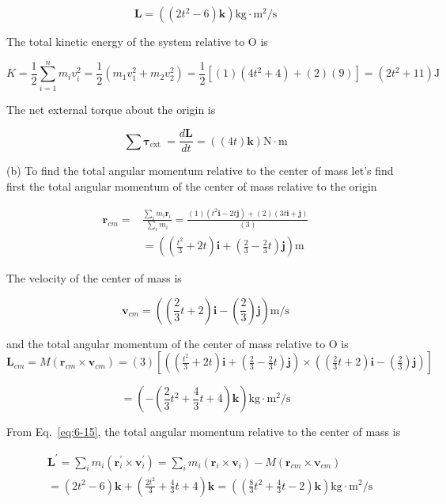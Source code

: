 \documentclass[10pt]{article}
\numberwithin{equation}{section}
\begin{document}
$$
\mathbf{L}=\left(\left(2 t^{2}-6\right) \mathbf{k}\right) \mathrm{kg} \cdot \mathrm{m}^{2} / \mathrm{s}
$$

The total kinetic energy of the system relative to O is

$$
K=\frac{1}{2} \sum_{i=1}^{n} m_{i} v_{i}^{2}=\frac{1}{2}\left(m_{1} v_{1}^{2}+m_{2} v_{2}^{2}\right)=\frac{1}{2}\left[(1)\left(4 t^{2}+4\right)+(2)(9)\right]=\left(2 t^{2}+11\right) \mathrm{J}
$$

The net external torque about the origin is

$$
\sum \boldsymbol{\tau}_{\text {ext }}=\frac{d \mathbf{L}}{d t}=((4 t) \mathbf{k}) \mathrm{N} \cdot \mathrm{m}
$$

(b) To find the total angular momentum relative to the center of mass let's find first the total angular momentum of the center of mass relative to the origin

$$
\begin{aligned}
\mathbf{r}_{c m}= & \frac{\sum_{i} m_{i} \mathbf{r}_{i}}{\sum_{i} m_{i}}=\frac{(1)\left(t^{2} \mathbf{i}-2 t \mathbf{j}\right)+(2)(3 t \mathbf{i}+\mathbf{j})}{(3)} \\
& =\left(\left(\frac{t^{2}}{3}+2 t\right) \mathbf{i}+\left(\frac{2}{3}-\frac{2}{3} t\right) \mathbf{j}\right) \mathrm{m}
\end{aligned}
$$

The velocity of the center of mass is

$$
\mathbf{v}_{c m}=\left(\left(\frac{2}{3} t+2\right) \mathbf{i}-\left(\frac{2}{3}\right) \mathbf{j}\right) \mathrm{m} / \mathrm{s}
$$

and the total angular momentum of the center of mass relative to O is\\
$\mathbf{L}_{c m}=M\left(\mathbf{r}_{c m} \times \mathbf{v}_{c m}\right)=(3)\left[\left(\left(\frac{t^{2}}{3}+2 t\right) \mathbf{i}+\left(\frac{2}{3}-\frac{2}{3} t\right) \mathbf{j}\right) \times\left(\left(\frac{2}{3} t+2\right) \mathbf{i}-\left(\frac{2}{3}\right) \mathbf{j}\right)\right]$

$$
=\left(-\left(\frac{2}{3} t^{2}+\frac{4}{3} t+4\right) \mathbf{k}\right) \mathrm{kg} \cdot \mathrm{m}^{2} / \mathrm{s}
$$

From Eq.~\eqref{eq:6-15}, the total angular momentum relative to the center of mass is

$$
\begin{aligned}
& \mathbf{L}^{\prime}=\sum_{i} m_{i}\left(\mathbf{r}_{i}^{\prime} \times \mathbf{v}_{i}^{\prime}\right)=\sum_{i} m_{i}\left(\mathbf{r}_{i} \times \mathbf{v}_{i}\right)-M\left(\mathbf{r}_{c m} \times \mathbf{v}_{c m}\right) \\
& =\left(2 t^{2}-6\right) \mathbf{k}+\left(\frac{2 t^{2}}{3}+\frac{4}{3} t+4\right) \mathbf{k}=\left(\left(\frac{8}{3} t^{2}+\frac{4}{3} t-2\right) \mathbf{k}\right) \mathrm{kg} \cdot \mathrm{m}^{2} / \mathrm{s}
\end{aligned}
$$
\end{document}
